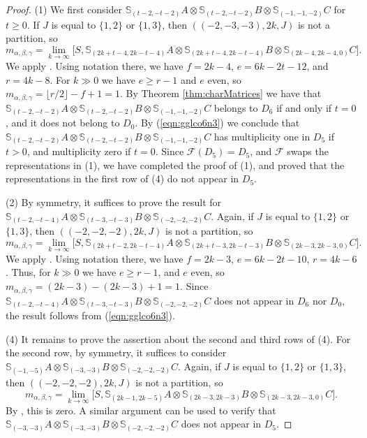 \documentclass[11pt,reqno]{amsart}
\newcommand{\oo}{\otimes}
\newcommand{\bS}{\mathbb{S}}
\newcommand{\mc}[1]{\mathcal{#1}}
\numberwithin{equation}{section}
\begin{document}
\begin{proof}
(1) We first consider	$\bS_{(t-2,-t-2)}A\oo \bS_{(t-2,-t-2)}B \oo \bS_{(-1,-1,-2)}C$ for $t\geq 0$. If $J$ is equal to $\{1,2\}$ or $\{1,3\}$, then $((-2,-3,-3),2k,J)$ is not a partition, so 
$$
m_{\alpha,\beta,\gamma}=\lim_{k\to \infty}\big[S,\bS_{(2k+t-4,2k-t-4)}A\oo \bS_{(2k+t-4,2k-t-4)}B \oo \bS_{(2k-4,2k-4,0)}C \big].
$$
We apply \cite[Corollary 4.3b]{raicu2012secant}. Using notation there, we have $f=2k-4$, $e=6k-2t-12$, and $r=4k-8$. For $k\gg 0$ we have $e\geq r-1$ and $e$ even, so $m_{\alpha,\beta,\gamma}=\lfloor r/2\rfloor -f+1=1$. By Theorem \ref{thm:charMatrices} we have that $\bS_{(t-2,-t-2)}A\oo \bS_{(t-2,-t-2)}B \oo \bS_{(-1,-1,-2)}C$ belongs to $D_6$ if and only if $t=0$, and it does not belong to $D_0$. By (\ref{eqn:gglco6n3}) we conclude that $\bS_{(t-2,-t-2)}A\oo \bS_{(t-2,-t-2)}B \oo \bS_{(-1,-1,-2)}C$ has multiplicity one in $D_5$ if $t>0$, and multiplicity zero if $t=0$. Since $\mc{F}(D_5)=D_5$, and $\mc{F}$ swaps the representations in (1), we have completed the proof of (1), and proved that the representations in the first row of (4) do not appear in $D_5$.

(2) By symmetry, it suffices to prove the result for $\bS_{(t-2,-t-4)}A\oo \bS_{(t-3,-t-3)}B \oo \bS_{(-2,-2,-2)}C$. Again, if $J$ is equal to $\{1,2\}$ or $\{1,3\}$, then $((-2,-2,-2),2k,J)$ is not a partition, so 
$$
m_{\alpha,\beta,\gamma}=\lim_{k\to \infty}\big[S,\bS_{(2k+t-2,2k-t-4)}A\oo \bS_{(2k+t-3,2k-t-3)}B \oo \bS_{(2k-3,2k-3,0)}C \big].
$$
We apply \cite[Corollary 4.3b]{raicu2012secant}. Using notation there, we have $f=2k-3$, $e=6k-2t-10$, $r=4k-6$. Thus, for $k\gg 0$ we have $e\geq r-1$, and $e$ even, so $m_{\alpha,\beta,\gamma}=(2k-3)-(2k-3)+1=1$. Since $\bS_{(t-2,-t-4)}A\oo \bS_{(t-3,-t-3)}B \oo \bS_{(-2,-2,-2)}C$ does not appear in $D_6$ nor $D_0$, the result follows from (\ref{eqn:gglco6n3}).

(4) It remains to prove the assertion about the second and third rows of (4). For the second row, by symmetry, it suffices to consider $\bS_{(-1,-5)}A\oo \bS_{(-3,-3)}B \oo \bS_{(-2,-2,-2)}C$. Again, if $J$ is equal to $\{1,2\}$ or $\{1,3\}$, then $((-2,-2,-2),2k,J)$ is not a partition, so 
$$
m_{\alpha,\beta,\gamma}=\lim_{k\to \infty}\big[S,\bS_{(2k-1,2k-5)}A\oo \bS_{(2k-3,2k-3)}B \oo \bS_{(2k-3,2k-3,0)}C \big].
$$
By \cite[Corollary 4.3b]{raicu2012secant}, this is zero. A similar argument can be used to verify that $\bS_{(-3,-3)}A\oo \bS_{(-3,-3)}B \oo \bS_{(-2,-2,-2)}C$ does not appear in $D_5$.
\end{proof}
\end{document}
